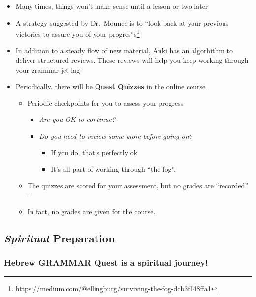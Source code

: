 \documentclass[
]{turabian-researchpaper}
\providecommand{\tightlist}{%
  \setlength{\itemsep}{0pt}\setlength{\parskip}{0pt}}
\begin{document}
\begin{itemize}
\item
  Many times, things won't make sense until a lesson or two later
\item
  A strategy suggested by Dr.~Mounce is to ``look back at your previous victories to assure you of your progres''s\footnote{\url{https://medium.com/@ellingburg/surviving-the-fog-dcb3f148ffa1}}
\item
  In addition to a steady flow of new material, Anki has an algorhithm to deliver structured reviews. These reviews will help you keep working through your grammar jet lag
\item
  Periodically, there will be \textbf{Quest Quizzes} in the online course

  \begin{itemize}
  \tightlist
  \item
    Periodic checkpoints for you to assess your progress

    \begin{itemize}
    \tightlist
    \item
      \emph{Are you OK to continue?}
    \item
      \emph{Do you need to review some more before going on?}

      \begin{itemize}
      \tightlist
      \item
        If you do, that's perfectly ok
      \item
        It's all part of working through ``the fog''.
      \end{itemize}
    \end{itemize}
  \item
    The quizzes are scored for your assessment, but no grades are ``recorded'' -\\
  \item
    In fact, no grades are given for the course.
  \end{itemize}
\end{itemize}

\hypertarget{spiritual-preparation}{%
\subsection*{\texorpdfstring{\emph{Spiritual} Preparation}{Spiritual Preparation}}\label{spiritual-preparation}}

\hypertarget{hebrew-grammar-quest-is-a-spiritual-journey}{%
\subsubsection*{Hebrew GRAMMAR Quest is a spiritual journey!}\label{hebrew-grammar-quest-is-a-spiritual-journey}}
\end{document}
